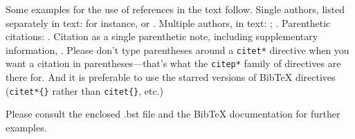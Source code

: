 \documentclass[letterpaper, 12pt]{article}
\begin{document}
Some examples for the use of references in the text follow.
Single authors, listed separately in text: for instance, \citet*{Ano08} or \citet*{Bele68}.
Multiple authors, in text: \citet*{VeRo00}; \citet*{AtDa04}.
Parenthetic citations: \citep*{AtDa04, Ther99}.
Citation as a single parenthetic note, including supplementary information, \citep*[see also][which includes detailed diagrams]{Zica02}.
Please don't type parentheses around a \texttt{citet*{}} directive when you want a citation in parentheses---that's what the \texttt{citep*{}} family of directives are there for.
And it is preferable to use the starred versions of BibTeX directives (\texttt{citet*\{\}} rather than \texttt{citet\{\}}, etc.)

Please consult the enclosed .bst file and the BibTeX documentation for further examples. 




\end{document}
